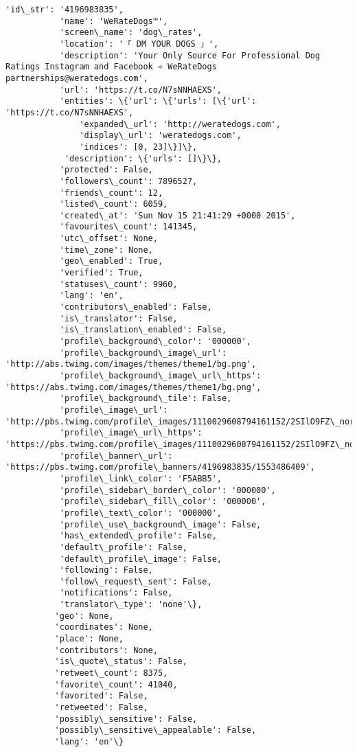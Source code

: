 \documentclass[11pt]{article}
\begin{document}
\begin{Verbatim}[commandchars=\\\{\}]
           'id\_str': '4196983835',
           'name': 'WeRateDogs™',
           'screen\_name': 'dog\_rates',
           'location': '「 DM YOUR DOGS 」',
           'description': 'Your Only Source For Professional Dog Ratings Instagram and Facebook ➪ WeRateDogs partnerships@weratedogs.com',
           'url': 'https://t.co/N7sNNHAEXS',
           'entities': \{'url': \{'urls': [\{'url': 'https://t.co/N7sNNHAEXS',
               'expanded\_url': 'http://weratedogs.com',
               'display\_url': 'weratedogs.com',
               'indices': [0, 23]\}]\},
            'description': \{'urls': []\}\},
           'protected': False,
           'followers\_count': 7896527,
           'friends\_count': 12,
           'listed\_count': 6059,
           'created\_at': 'Sun Nov 15 21:41:29 +0000 2015',
           'favourites\_count': 141345,
           'utc\_offset': None,
           'time\_zone': None,
           'geo\_enabled': True,
           'verified': True,
           'statuses\_count': 9960,
           'lang': 'en',
           'contributors\_enabled': False,
           'is\_translator': False,
           'is\_translation\_enabled': False,
           'profile\_background\_color': '000000',
           'profile\_background\_image\_url': 'http://abs.twimg.com/images/themes/theme1/bg.png',
           'profile\_background\_image\_url\_https': 'https://abs.twimg.com/images/themes/theme1/bg.png',
           'profile\_background\_tile': False,
           'profile\_image\_url': 'http://pbs.twimg.com/profile\_images/1110029608794161152/2SIlO9FZ\_normal.jpg',
           'profile\_image\_url\_https': 'https://pbs.twimg.com/profile\_images/1110029608794161152/2SIlO9FZ\_normal.jpg',
           'profile\_banner\_url': 'https://pbs.twimg.com/profile\_banners/4196983835/1553486409',
           'profile\_link\_color': 'F5ABB5',
           'profile\_sidebar\_border\_color': '000000',
           'profile\_sidebar\_fill\_color': '000000',
           'profile\_text\_color': '000000',
           'profile\_use\_background\_image': False,
           'has\_extended\_profile': False,
           'default\_profile': False,
           'default\_profile\_image': False,
           'following': False,
           'follow\_request\_sent': False,
           'notifications': False,
           'translator\_type': 'none'\},
          'geo': None,
          'coordinates': None,
          'place': None,
          'contributors': None,
          'is\_quote\_status': False,
          'retweet\_count': 8375,
          'favorite\_count': 41040,
          'favorited': False,
          'retweeted': False,
          'possibly\_sensitive': False,
          'possibly\_sensitive\_appealable': False,
          'lang': 'en'\}
\end{Verbatim}
            
\end{document}
